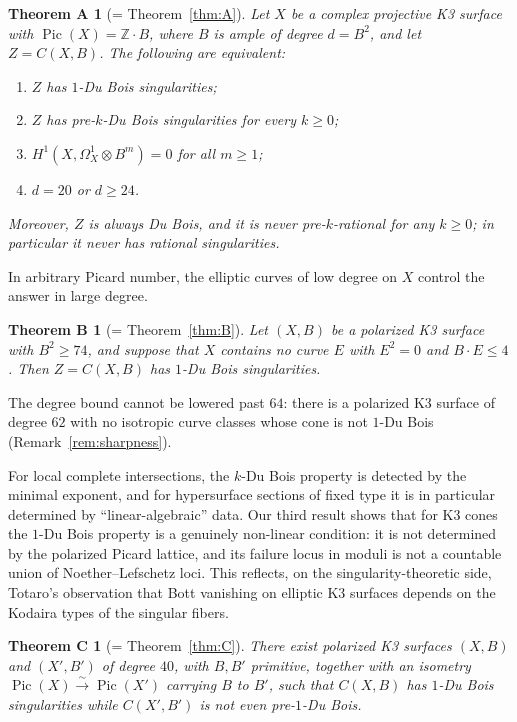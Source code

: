 \documentclass[11pt]{amsart}
\numberwithin{equation}{section}
\theoremstyle{plain}
\newtheorem*{theoremA}{Theorem A}
\newtheorem*{theoremB}{Theorem B}
\newtheorem*{theoremC}{Theorem C}
\theoremstyle{definition}
\theoremstyle{remark}
\newcommand{\ZZ}{\mathbb{Z}}
\newcommand{\Pic}{\operatorname{Pic}}
\begin{document}
\begin{theoremA}[= Theorem~\ref{thm:A}]
Let $X$ be a complex projective K3 surface with $\Pic(X)=\ZZ\cdot B$, where $B$ is ample of degree $d=B^2$, and let $Z=C(X,B)$.
The following are equivalent:
\begin{enumerate}
\item $Z$ has $1$-Du Bois singularities;
\item $Z$ has pre-$k$-Du Bois singularities for every $k\ge 0$;
\item $H^1(X,\Omega^1_X\otimes B^m)=0$ for all $m\ge 1$;
\item $d=20$ or $d\ge 24$.
\end{enumerate}
Moreover, $Z$ is always Du Bois, and it is never pre-$k$-rational for any $k\ge0$; in particular it never has rational singularities.
\end{theoremA}

In arbitrary Picard number, the elliptic curves of low degree on $X$ control the answer in large degree.

\begin{theoremB}[= Theorem~\ref{thm:B}]
Let $(X,B)$ be a polarized K3 surface with $B^2\ge 74$, and suppose that $X$ contains no curve $E$ with $E^2=0$ and $B\cdot E\le 4$.
Then $Z=C(X,B)$ has $1$-Du Bois singularities.
\end{theoremB}

The degree bound cannot be lowered past $64$: there is a polarized K3 surface of degree $62$ with no isotropic curve classes whose cone is not $1$-Du Bois (Remark~\ref{rem:sharpness}).

For local complete intersections, the $k$-Du Bois property is detected by the minimal exponent, and for hypersurface sections of fixed type it is in particular determined by ``linear-algebraic'' data.
Our third result shows that for K3 cones the $1$-Du Bois property is a genuinely non-linear condition: it is not determined by the polarized Picard lattice, and its failure locus in moduli is not a countable union of Noether--Lefschetz loci.
This reflects, on the singularity-theoretic side, Totaro's observation that Bott vanishing on elliptic K3 surfaces depends on the Kodaira types of the singular fibers.

\begin{theoremC}[= Theorem~\ref{thm:C}]
There exist polarized K3 surfaces $(X,B)$ and $(X',B')$ of degree $40$, with $B,B'$ primitive, together with an isometry $\Pic(X)\xrightarrow{\ \sim\ }\Pic(X')$ carrying $B$ to $B'$, such that $C(X,B)$ has $1$-Du Bois singularities while $C(X',B')$ is not even pre-$1$-Du Bois.
\end{theoremC}
\end{document}
